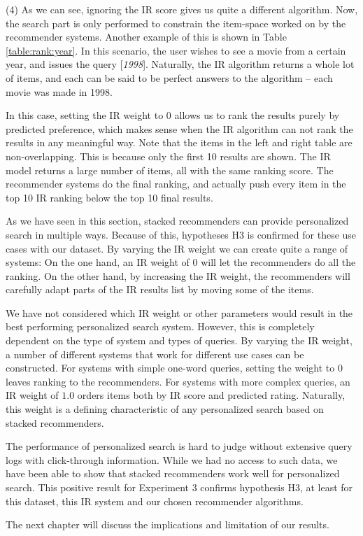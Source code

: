 (4) As we can see, ignoring the IR score gives us quite a different algorithm.
Now, the search part is only performed to constrain the item-space worked
on by the recommender systems.
Another example of this is shown in Table \ref{table:rank:year}.
In this scenario, the user wishes to see a movie from a certain year,
and issues the query [\emph{1998}].
Naturally, the IR algorithm returns a whole lot of items, and each can
be said to be perfect answers to the algorithm -- each movie
was made in 1998.

In this case, setting the IR weight to $0$ allows us to rank the results
purely by predicted preference, which makes sense when the IR algorithm
can not rank the results in any meaningful way.
Note that the items in the left and right table are non-overlapping.
This is because only the first 10 results are shown.
The IR model returns a large number of items,
all with the same ranking score.
The recommender systems do the final ranking, and actually
push every item in the top 10 IR ranking 
below the top 10 final results.



As we have seen in this section, stacked recommenders can provide personalized search
in multiple ways. 
Because of this, hypotheses H3 is confirmed for these use cases with our dataset.
By varying the IR weight we can create quite a range of systems:
On the one hand, an IR weight of 0 will let the recommenders do all the ranking.
On the other hand, by increasing the IR weight, the recommenders will carefully
adapt parts of the IR results list by moving some of the items.



We have not considered which IR weight or other parameters would result in the best performing
personalized search system.
However, this is completely dependent on the type of system and types of queries.
By varying the IR weight, a number of different systems that work for different use cases
can be constructed. For systems with simple one-word queries, setting the weight
to $0$ leaves ranking to the recommenders.
For systems with more complex queries, an IR weight of $1.0$ 
orders items both by IR score and predicted rating.
Naturally, this weight is a defining characteristic of any 
personalized search based on stacked recommenders.

The performance of personalized search is hard to judge without
extensive query logs with click-through information.
While we had no access to such data, 
we have been able to show that stacked recommenders
work well for personalized search.
This positive result for Experiment 3 confirms hypothesis H3,
at least for this dataset, this IR system and our chosen recommender algorithms.

The next chapter will discuss the implications and limitation of our results.

